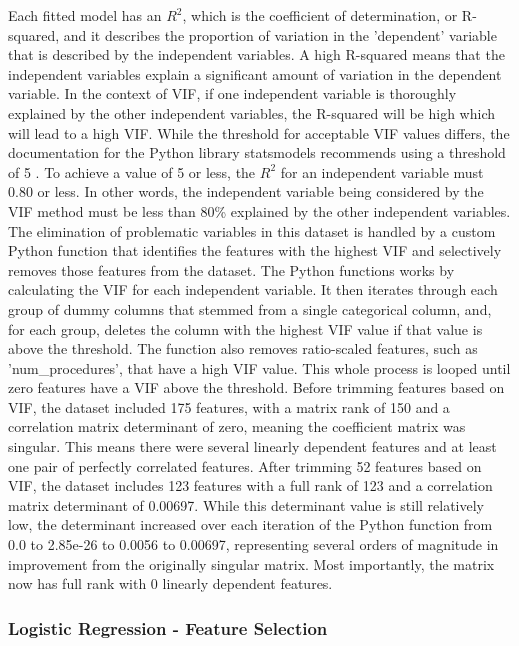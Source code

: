 \documentclass[sigconf]{acmart}
\begin{document}
Each fitted model has an \(R^2\), which is the coefficient of determination, or R-squared, and it describes the proportion of variation in the 'dependent' variable that is described by the independent variables. A high R-squared means that the independent variables explain a significant amount of variation in the dependent variable. In the context of VIF, if one independent variable is thoroughly explained by the other independent variables, the R-squared will be high which will lead to a high VIF. While the threshold for acceptable VIF values differs, the documentation for the Python library statsmodels recommends using a threshold of 5 \cite{cite15}. To achieve a value of 5 or less, the \(R^2\) for an independent variable must 0.80 or less. In other words, the independent variable being considered by the VIF method must be less than 80\% explained by the other independent variables.
The elimination of problematic variables in this dataset is handled by a custom Python function that identifies the features with the highest VIF and selectively removes those features from the dataset. The Python functions works by calculating the VIF for each independent variable. It then iterates through each group of dummy columns that stemmed from a single categorical column, and, for each group, deletes the column with the highest VIF value if that value is above the threshold. The function also removes ratio-scaled features, such as 'num\_procedures', that have a high VIF value. This whole process is looped until zero features have a VIF above the threshold.
Before trimming features based on VIF, the dataset included 175 features, with a matrix rank of 150 and a correlation matrix determinant of zero, meaning the coefficient matrix was singular. This means there were several linearly dependent features and at least one pair of perfectly correlated features. After trimming 52 features based on VIF, the dataset includes 123 features with a full rank of 123 and a correlation matrix determinant of 0.00697. While this determinant value is still relatively low, the determinant increased over each iteration of the Python function from 0.0 to 2.85e-26 to 0.0056 to 0.00697, representing several orders of magnitude in improvement from the originally singular matrix. Most importantly, the matrix now has full rank with 0 linearly dependent features.

\subsubsection{Logistic Regression - Feature Selection}
\end{document}
